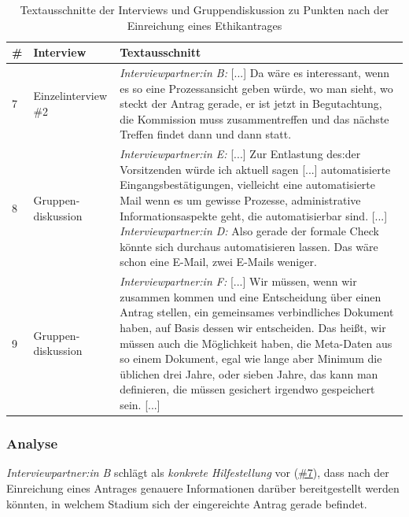 \documentclass[a4paper,12pt,twoside]{scrreprt}
\begin{document}
\begin{table}[ht!]
    \centering
    \begin{tabular}{p{.05\linewidth} | p{.2\linewidth} | p{.65\linewidth}}
        \# & \textbf{Interview} & \textbf{Textausschnitt}\\
        \hline
        7 & Einzelinterview \#2 & \textit{Interviewpartner:in B:} [...] Da wäre es interessant, wenn es so eine Prozessansicht geben würde, wo man sieht, wo steckt der Antrag gerade, er ist jetzt in Begutachtung, die Kommission muss zusammentreffen und das nächste Treffen findet dann und dann statt. \\
        \hline
        8 & Gruppen-diskussion & \textit{Interviewpartner:in E:} [...] Zur Entlastung des:der Vorsitzenden würde ich aktuell sagen [...] automatisierte Eingangsbestätigungen, vielleicht eine automatisierte Mail wenn es um gewisse Prozesse, administrative Informationsaspekte geht, die automatisierbar sind. [...]\newline
        \textit{Interviewpartner:in D:} Also gerade der formale Check könnte sich durchaus automatisieren lassen. Das wäre schon eine E-Mail, zwei E-Mails weniger. \\
        \hline
        9 & Gruppen-diskussion & \textit{Interviewpartner:in F:} [...] Wir müssen, wenn wir zusammen kommen und eine Entscheidung über einen Antrag stellen, ein gemeinsames verbindliches Dokument haben, auf Basis dessen wir entscheiden. Das heißt, wir müssen auch die Möglichkeit haben, die Meta-Daten aus so einem Dokument, egal wie lange aber Minimum die üblichen drei Jahre, oder sieben Jahre, das kann man definieren, die müssen gesichert irgendwo gespeichert sein. [...]
    \end{tabular}
    \caption{Textausschnitte der Interviews und Gruppendiskussion zu Punkten nach der Einreichung eines Ethikantrages}
    \label{tab:anforderungen-nach-einreichung}
\end{table}

\subsubsection*{Analyse}
\label{sub-sub-sec:analyse-nach-einreichung}

\textit{Interviewpartner:in B} schlägt als \textit{konkrete Hilfestellung} vor (\hyperref[tab:anforderungen-nach-einreichung]{\#7}), dass nach der Einreichung eines Antrages genauere Informationen darüber bereitgestellt werden könnten, in welchem Stadium sich der eingereichte Antrag gerade befindet.
\end{document}
